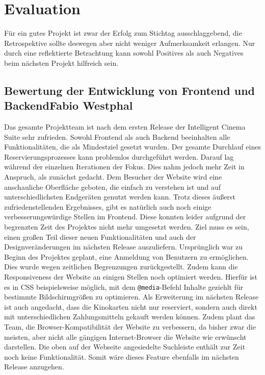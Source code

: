 \chapter{Evaluation} \label{Evaluation}
	
		Für ein gutes Projekt ist zwar der Erfolg zum Stichtag ausschlaggebend, die Retrospektive sollte deswegen aber nicht weniger Aufmerksamkeit erlangen. Nur durch eine reflektierte Betrachtung kann sowohl Positives als auch Negatives beim nächsten Projekt hilfreich sein.
		
	\section[Bewertung der Entwicklung von Frontend und Backend]{Bewertung der Entwicklung von Frontend und Backend{\hfill \normalsize Fabio Westphal}}
		Das gesamte Projektteam ist nach dem ersten Release der Intelligent Cinema Suite sehr zufrieden. Sowohl Frontend als auch Backend beeinhalten alle Funktionalitäten, die als Mindestziel gesetzt wurden. Der gesamte Durchlauf eines Reservierungsprozesses kann problemlos durchgeführt werden. Darauf lag während der einzelnen Iterationen der Fokus. Dies nahm jedoch mehr Zeit in Anspruch, als zunächst gedacht. 
		Dem Besucher der Website wird eine anschauliche Oberfläche geboten, die einfach zu verstehen ist und auf unterschiedlichsten Endgeräten genutzt werden kann. Trotz dieses äußerst zufriedenstellenden Ergebnisses, gibt es natürlich auch noch einige verbesserungswürdige Stellen im Frontend. Diese konnten leider aufgrund der begrenzten Zeit des Projektes nicht mehr umgesetzt werden. Ziel muss es sein, einen großen Teil dieser neuen Funktionalitäten und auch der Designveränderungen im nächsten Release auszuliefern. Ursprünglich war zu Beginn des Projektes geplant, eine Anmeldung von Benutzern zu ermöglichen. Dies wurde wegen zeitlichen Begrenzungen zurückgestellt. Zudem kann die Responsiveness der Website an einigen Stellen noch optimiert werden. Hierfür ist es in CSS beispielsweise möglich, mit dem \texttt{@media}-Befehl Inhalte geziehlt für bestimmte Bildschirmgrößen zu optimieren. Als Erweiterung im nächsten Release ist auch angedacht, dass die Kinokarten nicht nur reserviert, sondern auch direkt mit unterschiedlichen Zahlungsmitteln gekauft werden können. Zudem plant das Team, die Browser-Kompatibilität der Website zu verbessern, da bisher zwar die meisten, aber nicht alle gängigen Internet-Browser die Website wie erwünscht darstellen. 
		Die oben auf der Webseite angesiedelte Suchleiste enthält zur Zeit noch keine Funktionalität. Somit wäre dieses Feature ebenfalls im nächsten Release anzugehen.
		
